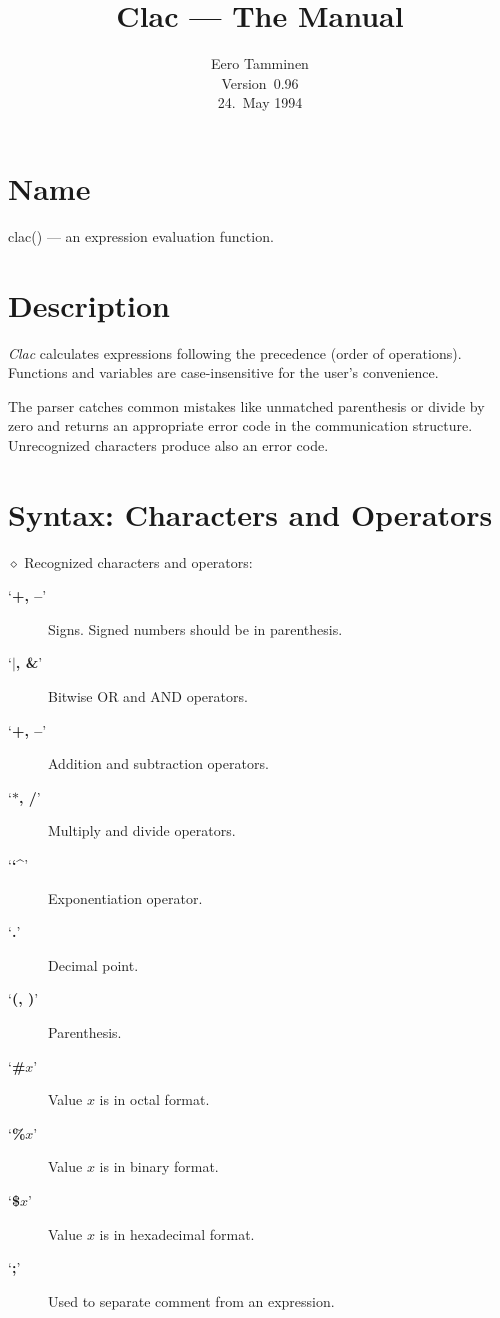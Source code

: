 

\newcommand{\myop}[1]{{\bf #1}}

\title{Clac --- The Manual}
\author{Eero Tamminen \\
	Version~0.96 \\
	24.~May 1994}

\pagestyle{myfootings}



\maketitle \makeauthor
\newpage

\section{Name}

	clac() --- an expression evaluation function.

\section{Description}

	{\sl Clac\/} calculates expressions following the precedence (order
	of operations). Functions and variables are case-insensitive for
	the user's convenience.

	The parser catches common mistakes like unmatched parenthesis or
	divide by zero and returns an appropriate error code in the
	communication structure. Unrecognized characters produce
	also an error code.


\section{Syntax: Characters and Operators}

	$\diamond$ Recognized characters and operators:
	\begin{description}
	\item[`\myop{+, --}']	Signs. Signed numbers should be in parenthesis.
	\item[`\myop{$|$, \&}']	Bitwise OR and AND operators.
	\item[`\myop{+, --}']	Addition and subtraction operators.
	\item[`\myop{$*$, /}']	Multiply and divide operators.
	\item[`\myop{\char`^}']	Exponentiation operator.
	\item[`\myop{.}']	Decimal point.
	\item[`\myop{(, )}']	Parenthesis.
	\item[`\myop{\#}$x$']	Value $x$ is in octal format.
	\item[`\myop{\%}$x$']	Value $x$ is in binary format.
	\item[`\myop{\$}$x$']	Value $x$ is in hexadecimal format.
	\item[`\myop{;}']	Used to separate comment from an expression.
	\end{description}


